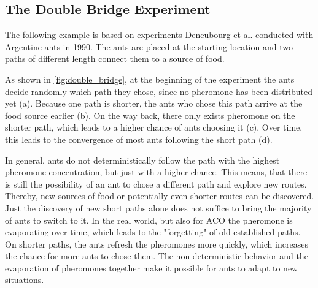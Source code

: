 \subsection{The Double Bridge Experiment}

The following example is based on experiments Deneubourg et al. \cite{deneubourg1990self} conducted with Argentine ants in 1990. The ants are placed at the starting location and two paths of different length connect them to a source of food.

As shown in \ref{fig:double_bridge}, at the beginning of the experiment the ants decide randomly which path they chose, since no pheromone has been distributed yet (a). Because one path is shorter, the ants who chose this path arrive at the food source earlier (b). On the way back, there only exists pheromone on the shorter path, which leads to a higher chance of ants choosing it (c). Over time, this leads to the convergence of most ants following the short path (d).

In general, ants do not deterministically follow the path with the highest pheromone concentration, but just with a higher chance. This means, that there is still the possibility of an ant to chose a different path and explore new routes. Thereby, new sources of food or potentially even shorter routes can be discovered. Just the discovery of new short paths alone does not suffice to bring the majority of ants to switch to it. In the real world, but also for ACO the pheromone is evaporating over time, which leads to the "forgetting" of old established paths. On shorter paths, the ants refresh the pheromones more quickly, which increases the chance for more ants to chose them. The non deterministic behavior and the evaporation of pheromones together make it possible for ants to adapt to new situations.

